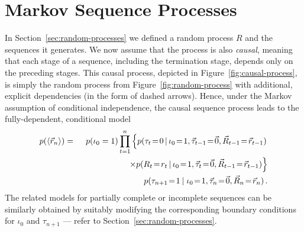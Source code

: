 \documentclass[a4paper]{article}
\begin{document}
\section{Markov Sequence Processes}
\label{sec:markov-processes}
In Section~\ref{sec:random-processes} we defined a random process $R$ and the sequences it generates.
We now assume that the process is also {\em causal}, meaning that each stage of a sequence,
including the termination stage, depends only on the preceding stages.
This causal process, depicted in Figure~\ref{fig:causal-process}, is simply the random process from
Figure~\ref{fig:random-process} with additional, explicit dependencies (in the form of dashed arrows).
Hence, under the Markov assumption of conditional independence,
the causal sequence process leads to the fully-dependent, conditional model
\begin{eqnarray}
p(\langle\vec{r}_n\rangle) & = &
p(\iota_0=1)
\prod_{t=1}^{n}\left\{p(\tau_t\!=\!0\,|\,\iota_0\!=\!1,\vec{\tau}_{t-1}\!=\!\vec{0},\vec{R}_{t-1}\!=\!\vec{r}_{t-1})\right.
\nonumber\\&&
\hspace*{20mm}\left.\times p(R_t\!=\!r_t\,|\,\iota_0\!=\!1,\vec{\tau}_t\!=\!\vec{0},\vec{R}_{t-1}\!=\!\vec{r}_{t-1})\right\}
\nonumber\\&&
p(\tau_{n+1}\!=\!1\:|\;\iota_0\!=\!1,\vec{\tau}_n\!=\!\vec{0},\vec{R}_n\!=\!\vec{r}_n)
\,.
\label{eq:temporal-model}
\end{eqnarray}
The related models for partially complete or incomplete sequences can be similarly obtained
by suitably modifying the corresponding boundary conditions for $\iota_0$ and $\tau_{n+1}$
--- refer to Section~\ref{sec:random-processes}.
\end{document}
